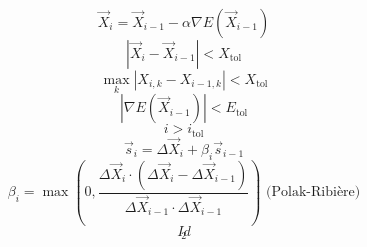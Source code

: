 \documentclass{scrreprt}
\begin{document}
\begin{equation}
  \vec X_i = \vec X_{i-1} - \alpha \nabla E(\vec X_{i-1})
\end{equation}
\begin{equation}
\left|\vec X_i - \vec X_{i-1}\right| < X_\text{tol}
\end{equation}
\begin{equation}
\max_k{\left|X_{i,k} - X_{i-1,k}\right|} < X_\text{tol}
\end{equation}
\begin{equation}
\left|\nabla E(\vec X_{i-1})\right| < E_\text{tol}
\end{equation}
\begin{equation}
i > i_\text{tol}
\end{equation}
\begin{equation}
  \vec s_i = \Delta \vec X_i + \beta_i \vec s_{i-1}
\end{equation}
\begin{equation}
  \beta_i = \max \left(0, \frac{\Delta \vec X_i \cdot \left(\Delta \vec X_i - \Delta \vec X_{i-1}\right)}{\Delta \vec X_{i-1} \cdot \Delta \vec X_{i-1}}\right) \text{~(Polak-Ribière)}
\end{equation}
\begin{equation}
Id
\end{equation}
\begin{equation}
_2
\end{equation}
\end{document}
